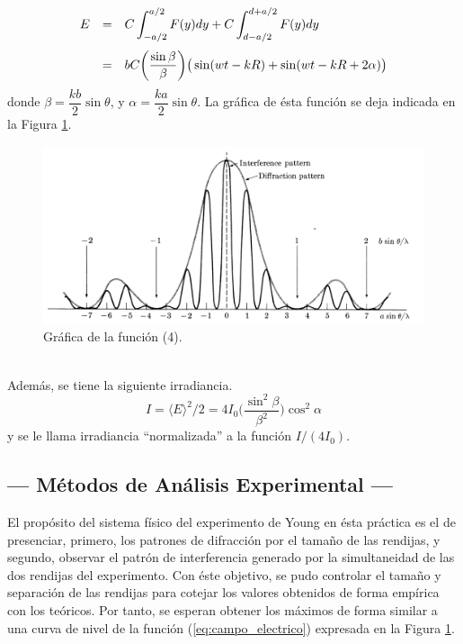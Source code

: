 \documentclass[12pt,a4paper]{article}
\begin{document}
\begin{equation}
	\begin{array}{rcl}
		E & = & C \displaystyle\int _{-a/2} ^{a/2} F(y) dy + C \displaystyle\int _{d-a/2} ^{d+a/2} F(y) dy\\[5mm]
		& = & bC \bigg(\dfrac{\sin \beta}{\beta}\bigg) \big(\sin (wt-kR) + \sin (wt-kR + 2\alpha)\big)
	\end{array}
	\label{eq:campo_electrico}
\end{equation}
donde \(\beta = \dfrac{kb}{2} \sin \theta\), y \(\alpha = \dfrac{ka}{2} \sin \theta\). La gráfica de ésta función se deja indicada en la Figura \ref{fig:grafica}. 
\begin{figure}[hbt!]
	\centering
	\includegraphics[width= 0.7 \linewidth]{1_INTRO/grafica}
	\caption{Gráfica de la función (4).}
	\label{fig:grafica}
\end{figure}\\
Además, se tiene la siguiente irradiancia.
\begin{equation}
	I= \langle E \rangle ^2/2 = 4I_0 \bigg(\dfrac{\sin ^2 \beta}{\beta ^2}\bigg) \cos ^2\alpha
	\label{eq:irradiancia}
\end{equation}
y se le llama irradiancia ``normalizada'' a la función \(I/(4I_0)\).

\subsection{--- Métodos de Análisis Experimental ---} %
\label{sub:metodos_analisis}
El propósito del sistema físico del experimento de Young en ésta práctica es el de presenciar, primero, los patrones de difracción por el tamaño de las rendijas, y segundo, observar el patrón de interferencia generado por la simultaneidad de las dos rendijas del experimento.
Con éste objetivo, se pudo controlar el tamaño y separación de las rendijas para cotejar los valores obtenidos de forma empírica con los teóricos.
Por tanto, se esperan obtener los máximos de forma similar a una curva de nivel de la función (\ref{eq:campo_electrico}) expresada en la Figura \ref{fig:grafica}.
\end{document}
